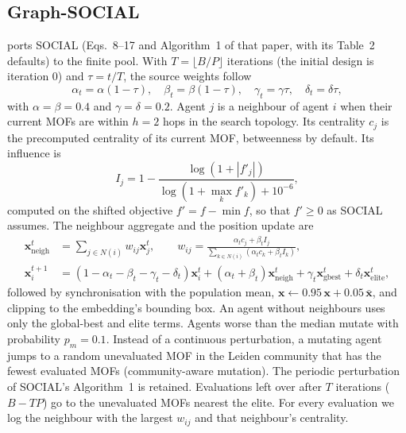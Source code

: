 \subsection{Graph-SOCIAL}
\label{sec:gs}
\gs{} ports SOCIAL \citep{jalali2026social} (Eqs.~8--17 and Algorithm~1 of that paper, with its Table~2 defaults) to the finite pool. With $T=\lfloor B/P\rfloor$ iterations (the initial design is iteration 0) and $\tau=t/T$, the source weights follow
\begin{equation}
\alpha_t=\alpha(1-\tau),\quad \beta_t=\beta(1-\tau),\quad \gamma_t=\gamma\tau,\quad \delta_t=\delta\tau,
\end{equation}
with $\alpha=\beta=0.4$ and $\gamma=\delta=0.2$. Agent $j$ is a neighbour of agent $i$ when their current MOFs are within $h=2$ hops in the search topology. Its centrality $c_j$ is the precomputed centrality of its current MOF, betweenness by default. Its influence is
\begin{equation}
I_j = 1-\frac{\log(1+|f'_j|)}{\log(1+\max_k f'_k)+10^{-6}},
\end{equation}
computed on the shifted objective $f'=f-\min f$, so that $f'\geq0$ as SOCIAL assumes. The neighbour aggregate and the position update are
\begin{align}
\mathbf{x}^{t}_{\mathrm{neigh}} &= \sum_{j\in N(i)} w_{ij}\mathbf{x}_j^t, \qquad w_{ij}=\frac{\alpha_t c_j+\beta_t I_j}{\sum_{k\in N(i)}(\alpha_t c_k+\beta_t I_k)},\\
\mathbf{x}_i^{t+1} &= (1-\alpha_t-\beta_t-\gamma_t-\delta_t)\mathbf{x}_i^t+(\alpha_t+\beta_t)\mathbf{x}^t_{\mathrm{neigh}}+\gamma_t\mathbf{x}^t_{\mathrm{gbest}}+\delta_t\mathbf{x}^t_{\mathrm{elite}},
\end{align}
followed by synchronisation with the population mean, $\mathbf{x}\leftarrow0.95\,\mathbf{x}+0.05\,\bar{\mathbf{x}}$, and clipping to the embedding's bounding box. An agent without neighbours uses only the global-best and elite terms. Agents worse than the median mutate with probability $p_m=0.1$. Instead of a continuous perturbation, a mutating agent jumps to a random unevaluated MOF in the Leiden community that has the fewest evaluated MOFs (community-aware mutation). The periodic perturbation of SOCIAL's Algorithm~1 is retained. Evaluations left over after $T$ iterations ($B-TP$) go to the unevaluated MOFs nearest the elite. For every evaluation we log the neighbour with the largest $w_{ij}$ and that neighbour's centrality.

